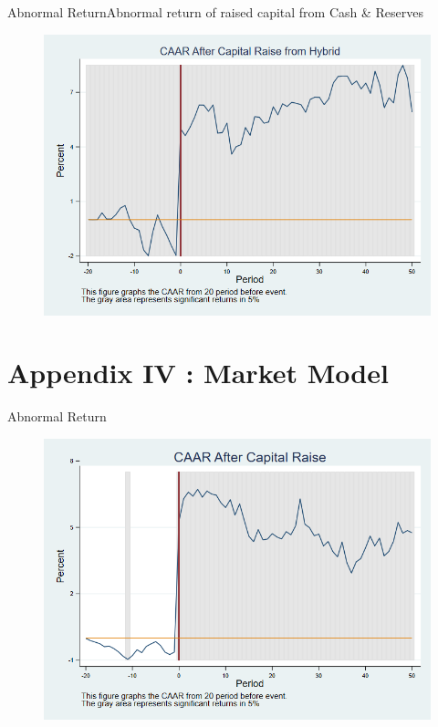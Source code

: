 \documentclass{beamer}
\begin{document}
\begin{frame}{Abnormal Return}{Abnormal return of raised capital from Cash \& Reserves}
	\label{car_abnormalreturn2Hybrid}
	\begin{figure}
		\centering
		\includegraphics[width=0.65\linewidth]{Output/car_abnormalreturn2Hybrid.png}
		\label{fig:car_abnormalreturn2Hybrid}
	\end{figure}
\end{frame}




\section{Appendix IV : Market Model }


\begin{frame}{Abnormal Return}
	\label{car_marketmodel}
	\begin{figure}
		\centering
		\includegraphics[width=0.7\linewidth]{Output/car_marketmodel.png}
		\label{fig:car_marketmodel}
	\end{figure}
\end{frame}
\end{document}
